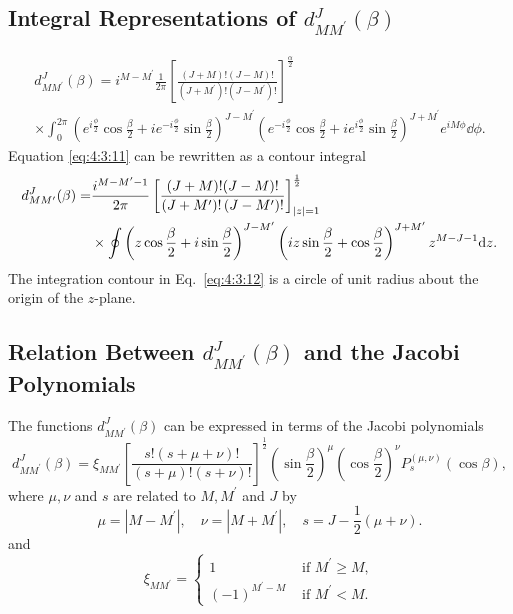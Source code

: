 \subsection{Integral Representations of $d_{M M^{\prime}}^{J}(\beta)$}\label{sec:4.3.3}
\begin{multline}
d_{M M^{\prime}}^{J}(\beta)=i^{M-M^{\prime}} \frac{1}{2 \pi}\left[\frac{(J+M)!(J-M)!}{\left(J+M^{\prime}\right)!\left(J-M^{\prime}\right)!}\right]^{\frac{\alpha}{2}} \\
\times \int_{0}^{2 \pi}\left(e^{i \frac{\phi}{2}} \cos \frac{\beta}{2}+i e^{-i \frac{\phi}{2}} \sin \frac{\beta}{2}\right)^{J-M^{\prime}}\left(e^{-i \frac{\phi}{2}} \cos \frac{\beta}{2}+i e^{i \frac{\phi}{2}} \sin \frac{\beta}{2}\right)^{J+M^{\prime}} e^{i M \phi} \dd \phi .\label{eq:4:3:11}
\end{multline}
Equation \eqref{eq:4:3:11} can be rewritten as a contour integral
\begin{align}
d_{M M^{\prime}}^{J}(\beta)=&\frac{i^{M-M^{\prime}-1}}{2 \pi}  \left[\frac{(J+M)!(J-M)!}{\left(J+M^{\prime}\right)!\left(J-M^{\prime}\right)!}\right]_{|z|=1}^{\frac{1}{2}} \notag\\
& \times \oint\left(z \cos \frac{\beta}{2}+i \sin \frac{\beta}{2}\right)^{J-M^{\prime}}  \left(i z \sin \frac{\beta}{2}+\cos \frac{\beta}{2}\right)^{J+M^{\prime}} z^{M-J-1} \mathrm{d} z .\label{eq:4:3:12}
\end{align}
The integration contour in Eq.~\eqref{eq:4:3:12} is a circle of unit radius about the origin of the $z$-plane.

\subsection{Relation Between $d_{M M^{\prime}}^{J}(\beta)$ and the Jacobi Polynomials}\label{sec:4.3.4}
The functions $d_{M M^{\prime}}^{J}(\beta)$ can be expressed in terms of the Jacobi polynomials
\begin{equation}
d_{M M^{\prime}}^{J}(\beta)=\xi_{M M^{\prime}}\left[\frac{s!(s+\mu+\nu)!}{(s+\mu)!(s+\nu)!}\right]^{\frac{1}{2}}\left(\sin \frac{\beta}{2}\right)^{\mu}\left(\cos \frac{\beta}{2}\right)^{\nu} P_{s}^{(\mu, \nu)}(\cos \beta) ,\label{eq:4:3:13}
\end{equation}
where $\mu, \nu$ and $s$ are related to $M, M^{\prime}$ and $J$ by
\begin{equation}
\mu=\left|M-M^{\prime}\right|, \quad \nu=\left|M+M^{\prime}\right|, \quad s=J-\frac{1}{2}(\mu+\nu) . \label{eq:4:3:14}
\end{equation}
and
\begin{equation}
\xi_{M M^{\prime}}= \begin{cases}1 & \text { if } M^{\prime} \geq M  ,\label{eq:4:3:15}\\ (-1)^{M^{\prime}-M} & \text { if } M^{\prime}<M.\end{cases}
\end{equation}
